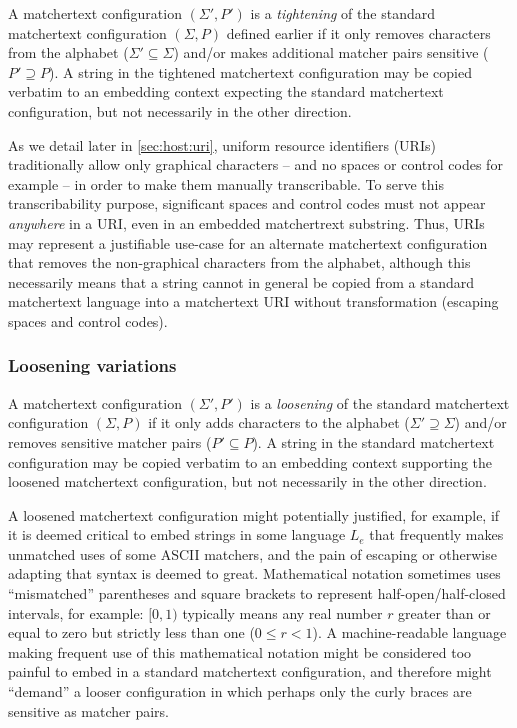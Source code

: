 A matchertext configuration $(\Sigma',P')$
is a \emph{tightening} of
the standard matchertext configuration $(\Sigma,P)$ defined earlier
if it only removes characters from the alphabet ($\Sigma' \subseteq \Sigma$)
and/or makes additional matcher pairs sensitive ($P' \supseteq P$).
A string in the tightened matchertext configuration
may be copied verbatim to an embedding context
expecting the standard matchertext configuration,
but not necessarily in the other direction.

As we detail later in \cref{sec:host:uri},
uniform resource identifiers (URIs)~\cite{rfc3986} traditionally allow
only graphical characters -- and no spaces or control codes for example --
in order to make them manually transcribable.
To serve this transcribability purpose,
significant spaces and control codes must not appear \emph{anywhere} in a URI,
even in an embedded matchertrext substring.
Thus, URIs may represent a justifiable use-case
for an alternate matchertext configuration that removes
the non-graphical characters from the alphabet,
although this necessarily means that a string cannot in general
be copied from a standard matchertext language into a matchertext URI
without transformation (\ie escaping spaces and control codes).

\subsubsection{Loosening variations}

A matchertext configuration $(\Sigma',P')$
is a \emph{loosening} of
the standard matchertext configuration $(\Sigma,P)$
if it only adds characters to the alphabet ($\Sigma' \supseteq \Sigma$)
and/or removes sensitive matcher pairs ($P' \subseteq P$).
A string in the standard matchertext configuration
may be copied verbatim to an embedding context
supporting the loosened matchertext configuration,
but not necessarily in the other direction.

A loosened matchertext configuration might potentially justified,
for example, if it is deemed critical to embed strings in some language $L_e$
that frequently makes unmatched uses of some ASCII matchers,
and the pain of escaping or otherwise adapting that syntax is deemed to great.
Mathematical notation sometimes uses
``mismatched'' parentheses and square brackets
to represent half-open/half-closed intervals, for example:
\eg $[0,1)$ typically means any real number $r$ greater than or equal to zero
but strictly less than one ($0 \le r < 1$).
A machine-readable language making frequent use of this mathematical notation
might be considered too painful to embed
in a standard matchertext configuration,
and therefore might ``demand'' a looser configuration
in which perhaps only the curly braces are sensitive as matcher pairs.

